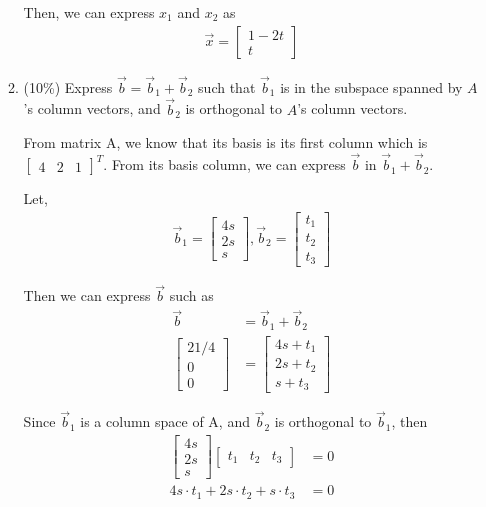 \documentclass[a4paper,10pt]{article}
\begin{document}
\begin{enumerate}
\begin{enumerate}
{        Then, we can express $x_1$ and $x_2$ as
        \begin{align}
            \vec{x} = \begin{bmatrix} 1-2t \\ t \end{bmatrix}
        \end{align}
    }

    \item (10\%) Express $\vec{b} = \vec{b}_1 + \vec{b}_2$ such that $\vec{b}_1$ is in the subspace spanned by $A$'s column vectors, and $\vec{b}_2$ is orthogonal to $A$'s column vectors.
    {\color{blue} 
        From matrix A, we know that its basis is its first column which is $\begin{bmatrix}4 & 2 & 1\end{bmatrix}^T$. 
        From its basis column, we can express $\vec{b}$ in $\vec{b}_1 + \vec{b}_2$.

        Let, 
        \begin{align}
            \vec{b}_1 = \begin{bmatrix}4s \\ 2s \\ s\end{bmatrix}, \vec{b}_2 = \begin{bmatrix}t_1 \\ t_2 \\ t_3\end{bmatrix}
        \end{align}

        Then we can express $\vec{b}$ such as 
        \begin{align}
            \vec{b} &= \vec{b}_1 + \vec{b}_2 \\
            \begin{bmatrix}21/4 \\ 0 \\ 0\end{bmatrix} &= \begin{bmatrix}4s + t_1 \\ 2s + t_2 \\ s + t_3\end{bmatrix}
        \end{align}

        Since $\vec{b}_1$ is a column space of A, and $\vec{b}_2$ is orthogonal to $\vec{b}_1$, then
        \begin{align}
            \begin{bmatrix}4s \\ 2s \\ s\end{bmatrix} \begin{bmatrix}t_1 & t_2 & t_3\end{bmatrix} &= 0 \\ 
            4s \cdot t_1 + 2s \cdot t_2 + s \cdot t_3 &= 0
        \end{align}

}
\end{enumerate}
\end{enumerate}
\end{document}
